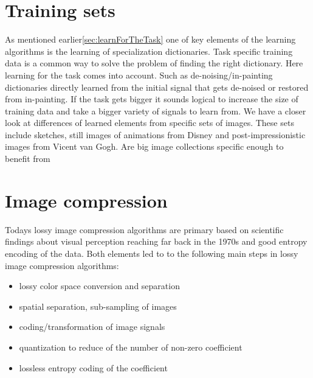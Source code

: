\section{Training sets}
As mentioned earlier\ref{sec:learnForTheTask} one of key elements 
of the learning algorithms is the learning of specialization dictionaries.
Task specific training data is a common way to solve the problem of finding 
the right dictionary. Here learning for the task comes into
account. Such as de-noising/in-painting dictionaries directly learned from the
initial signal that gets de-noised or restored from in-painting. If the task
gets bigger it sounds logical to increase the size of training data and take a
bigger variety of signals to learn from.  We have a closer look at differences
of learned elements from specific sets of images. These sets include sketches,
still images of animations from Disney and post-impressionistic images from
Vicent van Gogh. 
Are big image collections specific enough to benefit from 



\section{Image compression}
Todays lossy image compression algorithms are primary based on scientific
findings about visual perception reaching far back in the 1970s\cite{?} and
good entropy encoding of the data. Both elements led to to the
following main steps in lossy image compression algorithms:
\begin{itemize}
 \item lossy color space conversion and separation
 \item spatial separation, sub-sampling of images
 \item coding/transformation of image signals
 \item quantization to reduce of the number of non-zero coefficient 
 \item lossless entropy coding of the coefficient 
\end{itemize}

